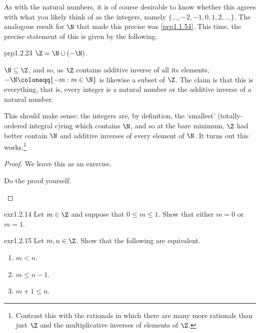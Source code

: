 As with the natural numbers, it is of course desirable to know whether this agrees with what you likely think of as the integers, namely $\{ \ldots ,-2,-1,0,1,2,\ldots \}$.  The analogous result for $\N$ that made this precise was \cref{prp1.1.54}.  This time, the precise statement of this is given by the following.
\begin{prp}{}{prp1.2.23}
$\Z =\N \cup (-\N )$.
\begin{rmk}
$\N \subseteq \Z$, and so, as $\Z$ contains additive inverse of all its elements, $-\N \coloneqq \{ -m:m\in \N \}$ is likewise a subset of $\Z$.  The claim is that this is everything, that is, every integer is a natural number or the additive inverse of a natural number.

This should make sense:  the integers are, by definition, the `smallest' (totally-ordered integral c)ring which contains $\N$, and so at the bare minimum, $\Z$ had better contain $\N$ and additive inverses of every element of $\N$.  It turns out this works.\footnote{Contrast this with the rationals in which there are many more rationals than just $\Z$ and the multiplicative inverses of elements of $\Z$.}
\end{rmk}
\begin{proof}
We leave this as an exercise.
\begin{exr}[breakable=false]{}{}
Do the proof yourself.
\end{exr}
\end{proof}
\end{prp}
\begin{exr}{}{exr1.2.14}
Let $m\in \Z$ and suppose that $0\leq m\leq 1$.  Show that either $m=0$ or $m=1$.
\end{exr}
\begin{exr}{}{exr1.2.15}
Let $m,n\in \Z$.  Show that the following are equivalent.
\begin{enumerate}
\item $m<n$.
\item $m\leq n-1$.
\item $m+1\leq n$.
\end{enumerate}
\end{exr}

